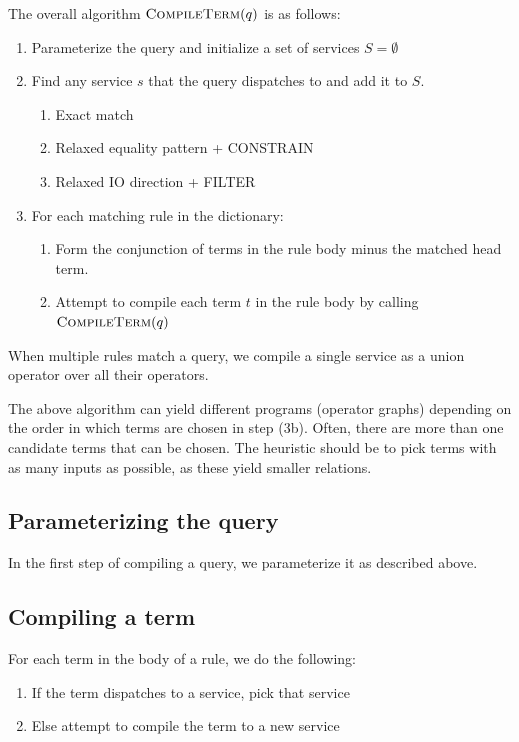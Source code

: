 \documentclass{article}
\theoremstyle{definition}
\begin{document}
The overall algorithm $\textsc{CompileTerm}(q)$ is as follows:
\begin{enumerate}
    \item Parameterize the query and initialize a set of services $S = \emptyset$
    \item Find any service $s$ that the query dispatches to and add it to $S$. \begin{enumerate}
        \item Exact match
        \item Relaxed equality pattern + CONSTRAIN
        \item Relaxed IO direction + FILTER
    \end{enumerate}
    \item For each matching rule in the dictionary: \begin{enumerate}
        \item Form the conjunction of terms in the rule body minus the matched head term.
        \item Attempt to compile each term $t$ in the rule body by calling $\textsc{CompileTerm}(q)$
    \end{enumerate}
\end{enumerate}

When multiple rules match a query, we compile a single service as a union operator over all their operators.

The above algorithm can yield different programs (operator graphs) depending on the order in which terms are chosen in step (3b). Often, there are more than one candidate terms that can be chosen. The heuristic should be to pick terms with as many inputs as possible, as these yield smaller relations.

\subsection{Parameterizing the query}

In the first step of compiling a query, we parameterize it as described above. 

\subsection{Compiling a term}

For each term in the body of a rule, we do the following:
\begin{enumerate}
    \item If the term dispatches to a service, pick that service
    \item Else attempt to compile the term to a new service
\end{enumerate}
\end{document}
